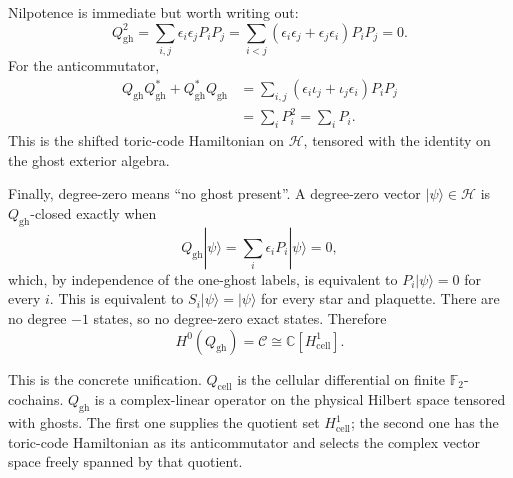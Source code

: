 Nilpotence is immediate but worth writing out:
\[
  Q_{\mathrm{gh}}^2
  =\sum_{i,j}\epsilon_i\epsilon_jP_iP_j
  =\sum_{i<j}(\epsilon_i\epsilon_j+\epsilon_j\epsilon_i)P_iP_j=0.
\]
For the anticommutator,
\[
\begin{aligned}
  Q_{\mathrm{gh}}Q_{\mathrm{gh}}^*
  +Q_{\mathrm{gh}}^*Q_{\mathrm{gh}}
  &=
  \sum_{i,j}(\epsilon_i\iota_j+\iota_j\epsilon_i)P_iP_j  \\
  &=\sum_i P_i^2
  =\sum_i P_i .
\end{aligned}
\]
This is the shifted toric-code Hamiltonian on \(\mathcal H\), tensored with the
identity on the ghost exterior algebra.

Finally, degree-zero means ``no ghost present''. A degree-zero vector
\(|\psi\rangle\in\mathcal H\) is \(Q_{\mathrm{gh}}\)-closed exactly when
\[
  Q_{\mathrm{gh}}|\psi\rangle
  =\sum_i \epsilon_iP_i|\psi\rangle=0,
\]
which, by independence of the one-ghost labels, is equivalent to
\(P_i|\psi\rangle=0\) for every \(i\). This is equivalent to
\(S_i|\psi\rangle=|\psi\rangle\) for every star and plaquette. There are no
degree \(-1\) states, so no degree-zero exact states. Therefore
\[
  H^0(Q_{\mathrm{gh}})=\mathcal C
  \cong \mathbb C[H^1_{\mathrm{cell}}].
\]

This is the concrete unification. \(Q_{\mathrm{cell}}\) is the cellular
differential on finite \(\mathbb F_2\)-cochains. \(Q_{\mathrm{gh}}\) is a
complex-linear operator on the physical Hilbert space tensored with ghosts. The
first one supplies the quotient set \(H^1_{\mathrm{cell}}\); the second one has
the toric-code Hamiltonian as its anticommutator and selects the complex vector
space freely spanned by that quotient.
